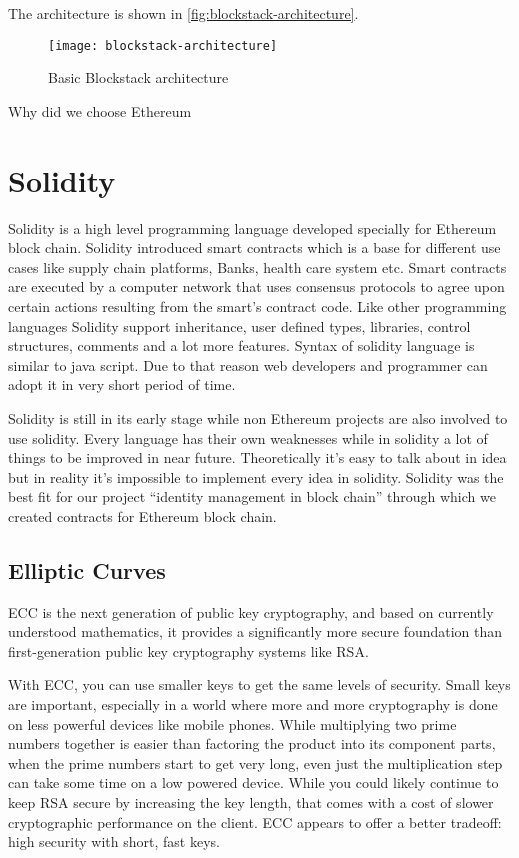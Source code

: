 The architecture is shown in \ref{fig:blockstack-architecture}.
\begin{figure}[h]
	\centering
  \texttt{[image: blockstack-architecture]}
	\caption{Basic Blockstack architecture}
	\label{fig1}
\end{figure}

\begin{notation}
	Why did we choose Ethereum
\end{notation}

\section{Solidity}
Solidity is a high level programming language developed specially for Ethereum block chain. Solidity introduced smart contracts which is a base for different use cases like supply chain platforms, Banks, health care system etc. Smart contracts are executed by a computer network that uses consensus protocols to agree upon certain actions resulting from the smart’s contract code. Like other programming languages Solidity support inheritance, user defined types, libraries, control structures, comments and a lot more features. Syntax of solidity language is similar to java script. Due to that reason web developers and programmer can adopt it in very short period of time.

Solidity is still in its early stage while non Ethereum projects are also involved to use solidity. Every language has their own weaknesses while in solidity a lot of things to be improved in near future. Theoretically it’s easy to talk about in idea but in reality it’s impossible to implement every idea in solidity. Solidity was the best fit for our project “identity management in block chain” through which we created contracts for Ethereum block chain.

\subsection{Elliptic Curves}
ECC is the next generation of public key cryptography, and based on currently understood mathematics, it provides a significantly more secure foundation than first-generation public key cryptography systems like RSA.

With ECC, you can use smaller keys to get the same levels of security. Small keys are important, especially in a world where more and more cryptography is done on less powerful devices like mobile phones. While multiplying two prime numbers together is easier than factoring the product into its component parts, when the prime numbers start to get very long, even just the multiplication step can take some time on a low powered device. While you could likely continue to keep RSA secure by increasing the key length, that comes with a cost of slower cryptographic performance on the client. ECC appears to offer a better tradeoff: high security with short, fast keys.

